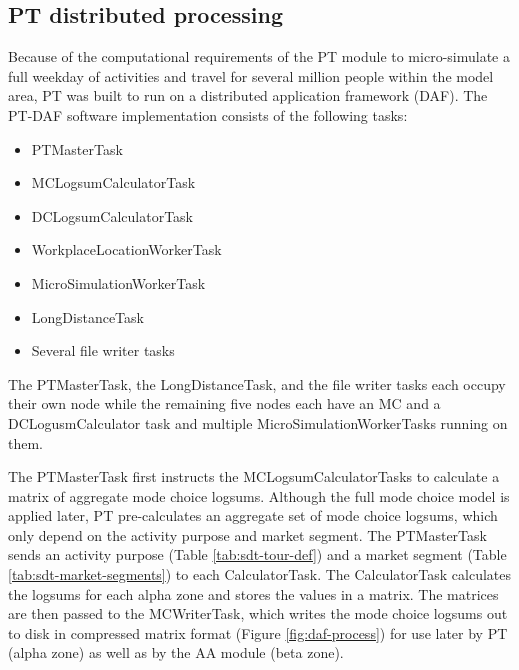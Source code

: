 \subsection{PT distributed processing}
Because of the computational requirements of the PT module to micro-simulate a full weekday of activities and travel for several million people within the model area, PT was built to run on a distributed application framework (DAF). The PT-DAF software implementation consists of the following tasks:
\begin{itemize}
\item PTMasterTask
\item MCLogsumCalculatorTask
\item DCLogsumCalculatorTask
\item WorkplaceLocationWorkerTask
\item MicroSimulationWorkerTask
\item LongDistanceTask 
\item Several file writer tasks  
\end{itemize}

\noindent The PTMasterTask, the LongDistanceTask, and the file writer tasks each occupy their own node while the remaining five nodes each have an MC and a DCLogusmCalculator task and multiple MicroSimulationWorkerTasks running on them. 

The PTMasterTask first instructs the MCLogsumCalculatorTasks to calculate a matrix of aggregate mode choice logsums. Although the full mode choice model is applied later, PT pre-calculates an aggregate set of mode choice logsums, which only depend on the activity purpose and market segment. The PTMasterTask sends an activity purpose (Table \ref{tab:sdt-tour-def}) and a market segment (Table \ref{tab:sdt-market-segments}) to each CalculatorTask. The CalculatorTask calculates the logsums for each alpha zone and stores the values in a matrix. The matrices are then passed to the MCWriterTask, which writes the mode choice logsums out to disk in compressed matrix format (Figure \ref{fig:daf-process}) for use later by PT (alpha zone) as well as by the AA module (beta zone). 

